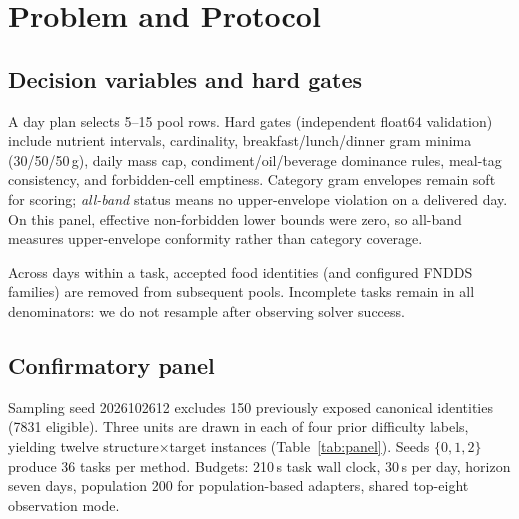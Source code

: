\documentclass{ieeeaccess}
\begin{document}
\section{Problem and Protocol}
\label{sec:protocol}
\subsection{Decision variables and hard gates}
A day plan selects 5--15 pool rows. Hard gates (independent float64 validation) include nutrient intervals, cardinality, breakfast/lunch/dinner gram minima (30/50/50\,g), daily mass cap, condiment/oil/beverage dominance rules, meal-tag consistency, and forbidden-cell emptiness. Category gram envelopes remain soft for scoring; \emph{all-band} status means no upper-envelope violation on a delivered day. On this panel, effective non-forbidden lower bounds were zero, so all-band measures upper-envelope conformity rather than category coverage.

Across days within a task, accepted food identities (and configured FNDDS families) are removed from subsequent pools. Incomplete tasks remain in all denominators: we do not resample after observing solver success.

\subsection{Confirmatory panel}
Sampling seed 2026102612 excludes 150 previously exposed canonical identities (7831 eligible). Three units are drawn in each of four prior difficulty labels, yielding twelve structure$\times$target instances (Table~\ref{tab:panel}). Seeds $\{0,1,2\}$ produce 36 tasks per method. Budgets: 210\,s task wall clock, 30\,s per day, horizon seven days, population 200 for population-based adapters, shared top-eight observation mode.
\end{document}
